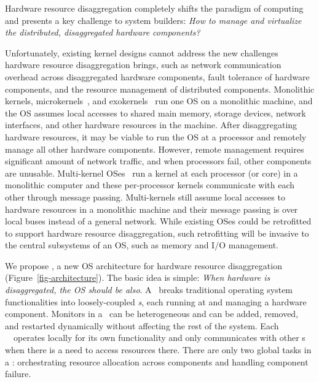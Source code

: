 Hardware resource disaggregation completely shifts the paradigm of computing
and presents a key challenge to system builders:
{\em How to manage and virtualize the distributed, disaggregated hardware components?}

Unfortunately, existing kernel designs cannot address the new challenges hardware resource disaggregation brings,
such as network communication overhead across disaggregated hardware components, fault tolerance of hardware components, 
and the resource management of distributed components.
Monolithic kernels, microkernels~\cite{seL4-SOSP13}, and exokernels~\cite{Exokernel-SOSP95} run one OS on a monolithic machine,
and the OS assumes local accesses to shared main memory, storage devices, network interfaces, 
and other hardware resources in the machine.
After disaggregating hardware resources, it may be viable to run the OS at a processor and remotely manage all other hardware components.
However, remote management requires significant amount of network traffic,
and when processors fail, other components are unusable.
Multi-kernel OSes~\cite{Baumann-SOSP09,Helios-SOSP,fos-SOCC,Hive-SOSP} run a kernel
at each processor (or core) in a monolithic computer and these per-processor kernels communicate with each other through message passing.
Multi-kernels still assume local accesses to hardware resources in a monolithic machine
and their message passing is over local buses instead of a general network.
While existing OSes could be retrofitted to support hardware resource disaggregation, 
such retrofitting will be invasive to the central subsystems of an OS, such as memory and I/O management.



We propose {\em \splitkernel}, a new OS architecture for hardware resource disaggregation (Figure~\ref{fig-architecture}).
The basic idea is simple: \textit{When hardware is disaggregated, the OS should be also}.  
A \splitkernel\ breaks traditional operating system functionalities into loosely-coupled {\em \microos{}s},
each running at and managing a hardware component.
Monitors in a \splitkernel\ can be heterogeneous and can be added, removed, 
and restarted dynamically without affecting the rest of the system.
Each \splitkernel\ \microos\ operates locally for its own functionality and
only communicates with other \microos{}s when there is a need to access resources there.
There are only two global tasks in a \splitkernel: 
orchestrating resource allocation across components 
and handling component failure.


